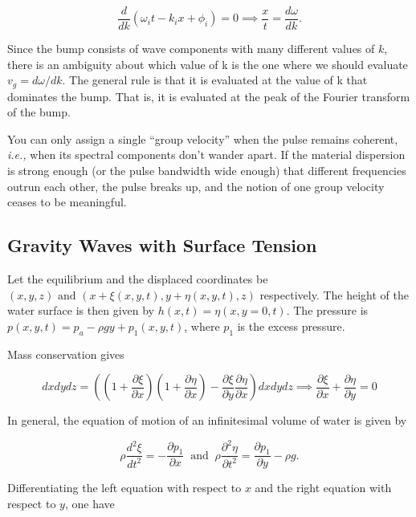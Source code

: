 \documentclass[a4paper,12pt]{report}
\begin{document}
\begin{equation}
	\frac{d}{dk} (\omega_{i}t - k_{i}x + \phi _{i}) = 0 \implies \frac{x}{t} = \frac{d \omega }{dk}.  
\end{equation}

Since the bump consists of wave components with many different values of \(k\), there is
an ambiguity about which value of k is the one where we should evaluate \(v_{g} = d \omega /dk\). The
general rule is that it is evaluated at the value of k that dominates the bump. That is, it is
evaluated at the peak of the Fourier transform of the bump.


You can only assign a single ``group velocity'' when the pulse remains coherent, \textit{i.e.,} when its spectral components don't wander apart. If the material dispersion is strong enough (or the pulse bandwidth wide enough) that different frequencies outrun each other, the pulse breaks up, and the notion of one group velocity ceases to be meaningful.

\subsection{Gravity Waves with Surface Tension}

Let the equilibrium and the displaced coordinates be \((x,y,z) \text { and } (x+\xi (x,y,t), y+\eta (x,y,t),z)\) respectively. The height of the water surface is then given by \(h(x,t) = \eta (x,y=0,t)\). The pressure is \(p(x,y,t) = p_{a} - \rho gy + p_1 (x,y,t)\), where \(p_1 \) is the excess pressure.

Mass conservation gives 

\begin{equation}
	dxdydz = \left( \left( 1+\frac{\partial \xi }{\partial x}  \right) \left( 1+\frac{\partial \eta }{\partial x}  \right) - \frac{\partial \xi }{\partial y} \frac{\partial \eta }{\partial x}   \right)dxdydz \implies \frac{\partial \xi }{\partial x} + \frac{\partial \eta }{\partial y}= 0  
\end{equation}

In general, the equation of motion of an infinitesimal volume of water is given by 

\begin{equation}
	\rho \frac{d^2\xi }{dt^2} = - \frac{\partial p_1 }{\partial x} ~\text { and }~ \rho \frac{\partial^2 \eta }{\partial t^2} = \frac{\partial p_1}{\partial y} - \rho g.    
\end{equation}

Differentiating the left equation with respect to \(x\) and the right equation with respect to \(y\), one have 
\end{document}
